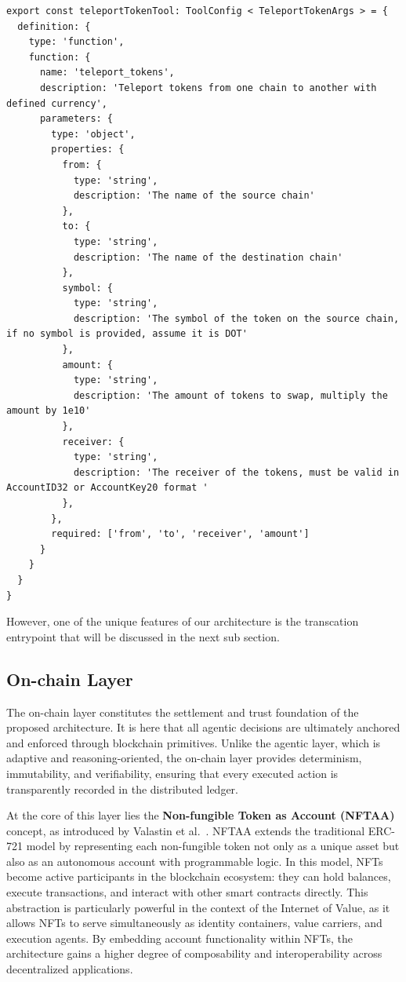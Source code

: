 \begin{lstlisting}[caption={Tool definition for OpenAI GPT-4o model}, label={lst:tooldefiniton}]
export const teleportTokenTool: ToolConfig < TeleportTokenArgs > = {
  definition: {
    type: 'function',
    function: {
      name: 'teleport_tokens',
      description: 'Teleport tokens from one chain to another with defined currency',
      parameters: {
        type: 'object',
        properties: {
          from: {
            type: 'string',
            description: 'The name of the source chain'
          },
          to: {
            type: 'string',
            description: 'The name of the destination chain'
          },
          symbol: {
            type: 'string',
            description: 'The symbol of the token on the source chain, if no symbol is provided, assume it is DOT'
          },
          amount: {
            type: 'string',
            description: 'The amount of tokens to swap, multiply the amount by 1e10'
          },
          receiver: {
            type: 'string',
            description: 'The receiver of the tokens, must be valid in AccountID32 or AccountKey20 format '
          },
        },
        required: ['from', 'to', 'receiver', 'amount']
      }
    }
  }
}
\end{lstlisting}

However, one of the unique features of our architecture is the transcation entrypoint that will be discussed in the next sub section.

\subsection{On-chain Layer}

The on-chain layer constitutes the settlement and trust foundation of the proposed architecture. It is here that all agentic decisions are ultimately anchored and enforced through blockchain primitives. Unlike the agentic layer, which is adaptive and reasoning-oriented, the on-chain layer provides determinism, immutability, and verifiability, ensuring that every executed action is transparently recorded in the distributed ledger.

At the core of this layer lies the \textbf{Non-fungible Token as Account (NFTAA)} concept, as introduced by Valastin et al.~\cite{valastin2024nftaa}. NFTAA extends the traditional ERC-721 model by representing each non-fungible token not only as a unique asset but also as an autonomous account with programmable logic. In this model, NFTs become active participants in the blockchain ecosystem: they can hold balances, execute transactions, and interact with other smart contracts directly. This abstraction is particularly powerful in the context of the Internet of Value, as it allows NFTs to serve simultaneously as identity containers, value carriers, and execution agents. By embedding account functionality within NFTs, the architecture gains a higher degree of composability and interoperability across decentralized applications.


